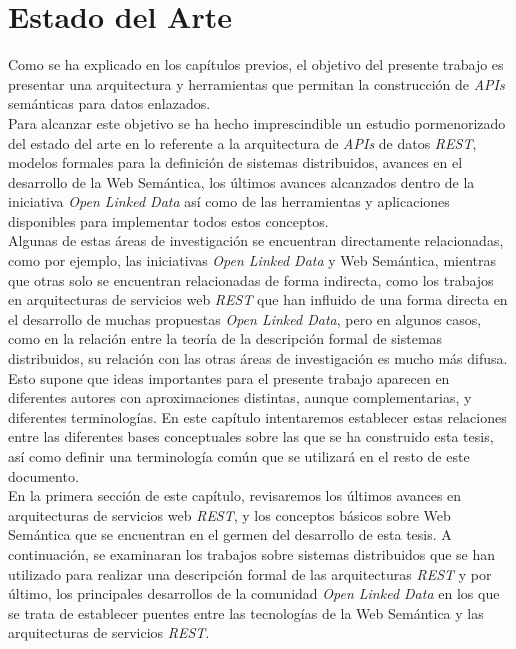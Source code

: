 \chapter{Estado del Arte}

Como se ha explicado en los cap\'itulos previos, el objetivo del presente trabajo es presentar una arquitectura y herramientas que permitan la construcci\'on de \textit{APIs} sem\'anticas para datos enlazados.\\
Para alcanzar este objetivo se ha hecho imprescindible un estudio pormenorizado del estado del arte en lo referente a la arquitectura de \textit{APIs} de datos \textit{REST}, modelos formales para la definici\'on de sistemas distribuidos, avances en el desarrollo de la Web Sem\'antica, los \'ultimos avances alcanzados dentro de la iniciativa \textit{Open Linked Data} as\'i como de las herramientas y aplicaciones disponibles para implementar todos estos conceptos.\\

Algunas de estas \'areas de investigaci\'on se encuentran directamente relacionadas, como por ejemplo, las iniciativas \textit{Open Linked Data} y Web Sem\'antica, mientras que otras solo se encuentran relacionadas de forma indirecta, como los trabajos en arquitecturas de servicios web \textit{REST} que han influido de una forma directa en el desarrollo de muchas propuestas \textit{Open Linked Data}, pero en algunos casos, como en la relaci\'on entre la teor\'ia de la descripci\'on formal de sistemas distribuidos, su relaci\'on con las otras \'areas de investigaci\'on es mucho m\'as difusa. Esto supone que ideas importantes para el presente trabajo aparecen en diferentes autores con aproximaciones distintas, aunque complementarias, y diferentes terminolog\'ias. En este cap\'itulo intentaremos establecer estas relaciones entre las diferentes bases conceptuales sobre las que se ha construido esta tesis, as\'i como definir una terminolog\'ia com\'un que se utilizar\'a en el resto de este documento.\\

En la primera secci\'on de este cap\'itulo, revisaremos los \'ultimos avances en arquitecturas de servicios web \textit{REST}, y los conceptos b\'asicos sobre Web Sem\'antica que se encuentran en el germen del desarrollo de esta tesis. A continuaci\'on, se examinaran los trabajos sobre sistemas distribuidos que se han utilizado para realizar una descripci\'on formal de las arquitecturas \textit{REST} y por \'ultimo, los principales desarrollos de la comunidad \textit{Open Linked Data} en los que se trata de establecer puentes entre las tecnolog\'ias de la Web Sem\'antica y las arquitecturas de servicios \textit{REST}.\\

